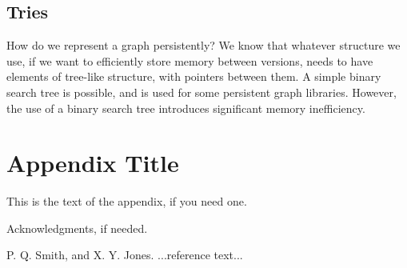 \documentclass[preprint]{sigplanconf}
\begin{document}
\subsection{Tries}
How do we represent a graph persistently? We know that whatever structure we use, if we want to efficiently store memory between versions, needs to have elements of tree-like structure, with pointers between them.
A simple binary search tree is possible, and is used for some persistent graph libraries.
However, the use of a binary search tree introduces significant memory inefficiency.






\appendix
\section{Appendix Title}

This is the text of the appendix, if you need one.

\acks

Acknowledgments, if needed.





\begin{thebibliography}{}
\softraggedright

P. Q. Smith, and X. Y. Jones. ...reference text...

\end{thebibliography}
\end{document}
